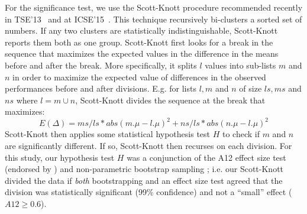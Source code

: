 \documentclass[10pt,conference]{IEEEtran}
\theoremstyle{break}
\theoremstyle{break}
\begin{document}
For the significance test,  we use the 
     Scott-Knott procedure  recommended  recently in TSE'13~\cite{mittas13} and at ICSE'15~\cite{ghotra2015revisiting}. This
     technique recursively bi-clusters a sorted
    set of numbers. If any two clusters are statistically indistinguishable, Scott-Knott
    reports them both as one group.
    Scott-Knott first looks for a break in the sequence that maximizes the expected
    values in the difference in the means before and after the break.
    More specifically,  it  splits $l$ values into sub-lists $m$ and $n$ in order to maximize the expected value of differences  in the observed performances before and after divisions. E.g. for lists $l,m$ and $n$ of size $ls,ms$ and $ns$ where $l=m\cup n$, Scott-Knott divides the sequence at the break that maximizes:
     \[E(\Delta)=ms/ls*abs(m.\mu - l.\mu)^2 + ns/ls*abs(n.\mu - l.\mu)^2\]
Scott-Knott then applies some statistical hypothesis test $H$ to check if $m$ and $n$ are significantly different. If so, Scott-Knott then recurses on each division.
    For this study, our hypothesis test $H$ was a conjunction of the A12 effect size test (endorsed by
    \cite{arcuri11})  and non-parametric bootstrap sampling \cite{efron94}; i.e. our Scott-Knott divided the data if {\em both}
    bootstrapping and an effect size test agreed that the division was statistically significant (99\% confidence) and not a ``small'' effect ($A12 \ge 0.6$).




\end{document}
